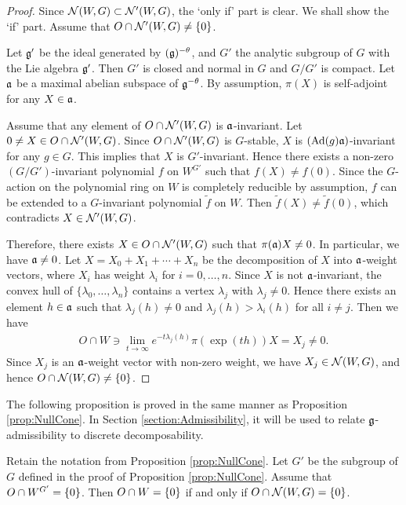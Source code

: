 \begin{proof}
	Since $\mathcal{N}(W, G) \subset \mathcal{N}'(W, G)$, the `only if' part is clear.
	We shall show the `if' part.
	Assume that $O \cap \mathcal{N}'(W, G) \neq \left\{0 \right\}$.

	Let $\mathfrak{g'}$ be the ideal generated by $(\mathfrak{g})^{-\theta}$, and $G'$ the analytic subgroup of $G$ with the Lie algebra $\mathfrak{g}'$.
	Then $G'$ is closed and normal in $G$ and $G/G'$ is compact.
	Let $\mathfrak{a}$ be a maximal abelian subspace of $\mathfrak{g}^{-\theta}$.
	By assumption, $\pi(X)$ is self-adjoint for any $X \in \mathfrak{a}$.

	Assume that any element of $O \cap \mathcal{N}'(W, G)$ is $\mathfrak{a}$-invariant.
	Let $0\neq X \in O \cap \mathcal{N}'(W, G)$.
	Since $O \cap \mathcal{N}'(W, G)$ is $G$-stable, $X$ is $(\mathrm{Ad}(g)\mathfrak{a})$-invariant for any $g \in G$.
	This implies that $X$ is $G'$-invariant.
	Hence there exists a non-zero $(G/G')$-invariant polynomial $f$ on $W^{G'}$ such that $f(X) \neq f(0)$.
	Since the $G$-action on the polynomial ring on $W$ is completely reducible by assumption, $f$ can be extended to a $G$-invariant polynomial $\tilde{f}$ on $W$.
	Then $\tilde{f}(X) \neq \tilde{f}(0)$, which contradicts $X \in \mathcal{N}'(W, G)$.

	Therefore, there exists $X \in O \cap \mathcal{N}'(W, G)$ such that $\pi(\mathfrak{a})X \neq 0$.
	In particular, we have $\mathfrak{a} \neq 0$.
	Let $X = X_0 + X_1 + \cdots + X_n$ be the decomposition of $X$ into $\mathfrak{a}$-weight vectors, where $X_i$ has weight $\lambda_i$ for $i = 0, \ldots, n$.
	Since $X$ is not $\mathfrak{a}$-invariant, the convex hull of $\{\lambda_0, \ldots, \lambda_n\}$ contains a vertex $\lambda_j$ with $\lambda_j \neq 0$.
	Hence there exists an element $h \in \mathfrak{a}$ such that $\lambda_j(h) \neq 0$ and $\lambda_j(h) > \lambda_i(h)$ for all $i \neq j$.
	Then we have
	\begin{align*}
		O \cap W \ni \lim_{t \to \infty} e^{-t\lambda_j(h)} \pi(\exp(th))X = X_j \neq 0.
	\end{align*}
	Since $X_j$ is an $\mathfrak{a}$-weight vector with non-zero weight, we have $X_j \in \mathcal{N}(W, G)$, and hence $O\cap \mathcal{N}(W, G) \neq \left\{0 \right\}$.
\end{proof}

The following proposition is proved in the same manner as Proposition \ref{prop:NullCone}. In Section \ref{section:Admissibility}, it will be used to relate $\mathfrak{g}$-admissibility to discrete decomposability.

\begin{proposition} \label{prop:IntersectionW}
	Retain the notation from Proposition \ref{prop:NullCone}.
	Let $G'$ be the subgroup of $G$ defined in the proof of Proposition \ref{prop:NullCone}.
	Assume that $O\cap W^{G'} = \left\{0 \right\}$.
	Then $O \cap W = \left\{0 \right\}$ if and only if $O \cap \mathcal{N}(W, G) = \left\{0 \right\}$.
\end{proposition}

